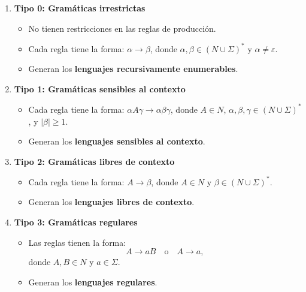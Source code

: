\documentclass{article}
\begin{document}
\begin{enumerate}
      \item \textbf{Tipo 0: Gramáticas irrestrictas}
            \begin{itemize}
                  \item No tienen restricciones en las reglas de producción.
                  \item Cada regla tiene la forma: \(\alpha \to \beta\), donde \(\alpha, \beta \in (N \cup \Sigma)^*\) y \(\alpha \neq \varepsilon\).
                  \item Generan los \textbf{lenguajes recursivamente enumerables}.
            \end{itemize}

      \item \textbf{Tipo 1: Gramáticas sensibles al contexto}
            \begin{itemize}
                  \item Cada regla tiene la forma: \(\alpha A \gamma \to \alpha \beta \gamma\), donde \(A \in N\), \(\alpha, \beta, \gamma \in (N \cup \Sigma)^*\), y \(|\beta| \geq 1\).
                  \item Generan los \textbf{lenguajes sensibles al contexto}.
            \end{itemize}

      \item \textbf{Tipo 2: Gramáticas libres de contexto}
            \begin{itemize}
                  \item Cada regla tiene la forma: \(A \to \beta\), donde \(A \in N\) y \(\beta \in (N \cup \Sigma)^*\).
                  \item Generan los \textbf{lenguajes libres de contexto}.
            \end{itemize}

      \item \textbf{Tipo 3: Gramáticas regulares}
            \begin{itemize}
                  \item Las reglas tienen la forma:
                        \[
                              A \to aB \quad \text{o} \quad A \to a,
                        \]
                        donde \(A, B \in N\) y \(a \in \Sigma\).
                  \item Generan los \textbf{lenguajes regulares}.
            \end{itemize}
\end{enumerate}
\end{document}
